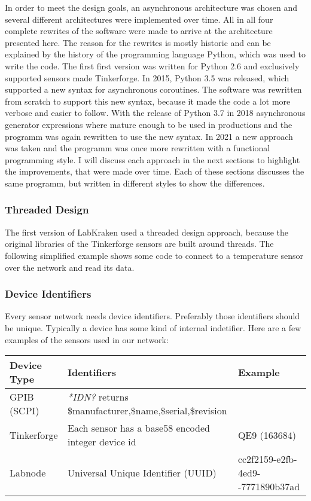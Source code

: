 In order to meet the design goals, an asynchronous architecture was chosen and several different architectures were implemented over time. All in all four complete rewrites of the software were made to arrive at the architecture presented here. The reason for the rewrites is mostly historic and can be explained by the history of the programming language Python, which was used to write the code. The first first version was written for Python 2.6 and exclusively supported sensors made Tinkerforge. In 2015, Python 3.5 was released, which supported a new syntax for asynchronous coroutines. The software was rewritten from scratch to support this new syntax, because it made the code a lot more verbose and easier to follow. With the release of Python 3.7 in 2018 asynchronous generator expressions where mature enough to be used in productions and the programm was again rewritten to use the new syntax. In 2021 a new approach was taken and the programm was once more rewritten with a functional programming style. I will discuss each approach in the next sections to highlight the improvements, that were made over time. Each of these sections discusses the same programm, but written in different styles to show the differences.

\subsubsection{Threaded Design}
The first version of LabKraken used a threaded design approach, because the original libraries of the Tinkerforge sensors are built around threads. The following simplified example shows some code to connect to a temperature sensor over the network and read its data.


\subsubsection{Device Identifiers}
Every sensor network needs device identifiers. Preferably those identifiers should be unique. Typically a device has some kind of internal indetifier. Here are a few examples of the sensors used in our network:

\begin{table}[h]
\centering
\begin{tabularx}{0.95\textwidth}{|l|p{6.5cm}|X|}
    \hline
    Device Type& Identifiers& Example\\
    \hline
    GPIB (SCPI)& \textit{*IDN?} returns \newline \$manufacturer,\$name,\$serial,\$revision& \\
    \hline
    Tinkerforge& Each sensor has a base58 encoded integer device id& QE9 (163684)\\
    \hline
    Labnode& Universal Unique Identifier (UUID) & cc2f2159-e2fb-4ed9-\newline8021-7771890b37ad\\
    \hline
\end{tabularx}
\end{table}

